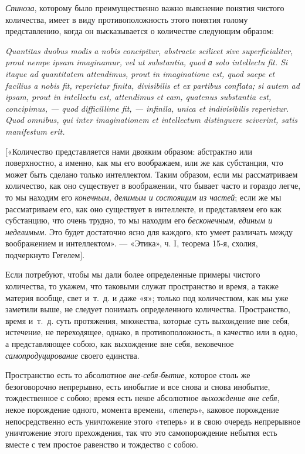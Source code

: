 {\em Спиноза}, которому было преимущественно важно
выяснение понятия чистого количества, имеет в виду противоположность этого
понятия голому представлению, когда он высказывается о количестве следующим
образом:

{\em Quantitas duobus modis a
nobis concipitur, abstracte scilicet sive superficialiter, prout nempe
ipsam imaginamur, vel ut substantia, quod а solo intellectu
fit. Si itaque ad quantitatem attendimus, prout in imaginatione est, quod
saepe et facilius a nobis fit, reperietur finita, divisibilis et ex
partibus conflata; si autem ad ipsam, prout in intellectu est, attendimus
et eam, quatenus substantia est, concipimus, — quod difficillime fit, —
infinila, unica et indivisibilis reperietur. Quod omnibus, qui inter
imaginationem et intellectum distinguere sciverint, satis manifestum
erit.}

[«Количество представляется нами двояким образом: абстрактно или
поверхностно, а именно, как мы его воображаем, или же как субстанция, что
может быть сделано только интеллектом. Таким образом, если мы рассматриваем
количество, как оно существует в воображении, что бывает часто и гораздо
легче, то мы находим его {\em конечным, делимым и
состоящим из частей}; если же мы рассматриваем его, как оно существует в
интеллекте, и представляем его как субстанцию, что очень трудно, то мы
находим его {\em бесконечным, единым и неделимым}. Это
будет достаточно ясно для каждого, кто умеет различать между воображением и
интеллектом». — «Этика», ч. I, теорема 15-я, схолия, подчеркнуто Гегелем].

Если потребуют, чтобы мы дали более определенные примеры чистого количества,
то укажем, что таковыми служат пространство и время, а также материя
вообще, свет и~т.~д. и даже «я»; только под количеством, как мы уже
заметили выше, не следует понимать определенного количества. Пространство,
время и~т.~д. суть протяжения, множества, которые суть выхождение вне себя,
истечение, не переходящее, однако, в противоположность, в качество или в
одно, а представляющее собою, как выхождение вне себя, вековечное
{\em самопродуцирование} своего единства.

Пространство есть то абсолютное {\em вне-себя-бытие},
которое столь же безоговорочно непрерывно, есть инобытие и все снова и
снова инобытие, тождественное с собою; время есть некое абсолютное
{\em выхождение вне себя}, некое порождение одного,
момента времени, «{\em теперь}», каковое порождение
непосредственно есть уничтожение этого «теперь» и в свою очередь
непрерывное уничтожение этого прехождения, так что это самопорождение
небытия есть вместе с тем простое равенство и тождество с собою.

